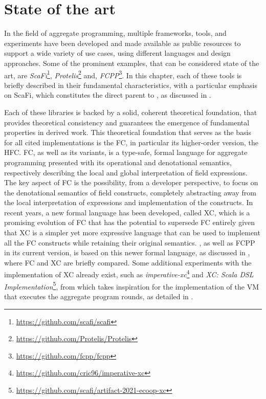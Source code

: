 \chapter{State of the art}
\label{chap:state-of-the-art}

In the field of aggregate programming\cite{aggregate-programming}, multiple frameworks, tools, and experiments have been developed and made available as public resources to support a wide variety of use cases, using different languages and design approaches.
%
Some of the prominent examples, that can be considered state of the art, are \textit{ScaFi}\footnote{\url{https://github.com/scafi/scafi}}\cite{scafi}, \textit{Protelis}\footnote{\url{https://github.com/Protelis/Protelis}}\cite{protelis} and, \textit{FCPP}\footnote{\url{https://github.com/fcpp/fcpp}}\cite{fcpp}.
%
In this chapter, each of these tools is briefly described in their fundamental characteristics, with a particular emphasis on ScaFi, which constitutes the direct parent to \this, as discussed in .

Each of these libraries is backed by a solid, coherent theoretical foundation, that provides theoretical consistency and guarantees the emergence of fundamental properties in derived work.
%
This theoretical foundation that serves as the basis for all cited implementations is the \ac{FC}\cite{fc}, in particular its higher-order version, the \ac{HFC}\cite{hofc}.
%
\ac{FC}, as well as its variants, is a type-safe, formal language for aggregate programming\cite{fc, from-dc-to-fc-and-ap} presented with its operational and denotational semantics, respectively describing the local and global interpretation of field expressions\cite{from-dc-to-fc-and-ap}.
%
The key aspect of \ac{FC} is the possibility, from a developer perspective, to focus on the denotational semantics of field constructs, completely abstracting away from the local interpretation of expressions and implementation of the constructs.
%
In recent years, a new formal language has been developed, called \ac{XC}\cite{xc}, which is a promising evolution of \ac{FC} that has the potential to supersede \ac{FC} entirely given that \ac{XC} is a simpler yet more expressive language that can be used to implement all the \ac{FC} constructs while retaining their original semantics.
%
\this, as well as FCPP in its current version, is based on this newer formal language, as discussed in , where \ac{FC} and \ac{XC} are briefly compared.
%
Some additional experiments with the implementation of \ac{XC} already exist, such as \textit{imperative-xc}\footnote{\url{https://github.com/cric96/imperative-xc}} and \textit{XC: Scala DSL Implementation}\footnote{\url{https://github.com/scafi/artifact-2021-ecoop-xc}}\cite{xc-experiment-with-scafi}, from which \this takes inspiration for the implementation of the \ac{VM} that executes the aggregate program rounds, as detailed in .

